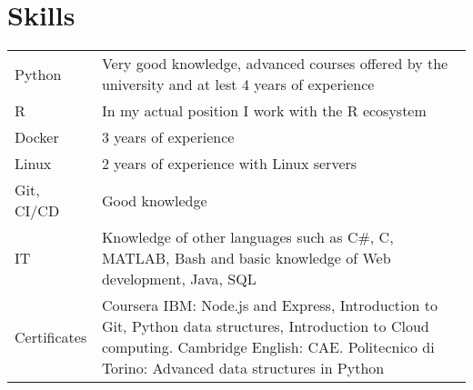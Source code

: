 \documentclass[a4paper,12pt]{article}
\begin{document}



\section{Skills}
\begin{tabularx}{\linewidth}{@{}l X@{}}
Python  &  \normalsize{Very good knowledge, advanced courses offered by the university and at lest 4 years of experience}\\ 
R &  \normalsize{In my actual position I work with the R ecosystem}\\
Docker  &  \normalsize{3 years of experience}\\  
Linux  &  \normalsize{2 years of experience with Linux servers}\\  
Git, CI/CD &  \normalsize{Good knowledge}\\
IT & \normalsize{Knowledge of other languages such as C\#, C, MATLAB, Bash and basic knowledge of Web development, Java, SQL} \\
Certificates  &  \normalsize{Coursera IBM: Node.js and Express, Introduction to Git, Python data structures, Introduction to Cloud computing. Cambridge English: CAE. Politecnico di Torino: Advanced data structures in Python}\\  

\end{tabularx}
\end{document}
